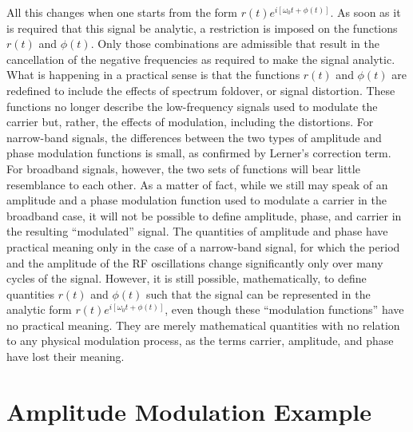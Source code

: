 \documentclass[11pt]{article}
\begin{document}
All this changes when one starts from the form $r(t)e^{i[\omega_0 t + \phi(t)]}$. As soon as it is required that this signal be analytic, a restriction is imposed on the functions $r(t)$ and $\phi(t)$. Only those combinations are admissible that result in the cancellation of the negative frequencies as required to make the signal analytic. What is happening in a practical sense is that the functions $r(t)$ and $\phi(t)$ are redefined to include the effects of spectrum foldover, or signal distortion. These functions no longer describe the low-frequency signals used to modulate the carrier but, rather, the effects of modulation, including the distortions. For narrow-band signals, the differences between the two types of amplitude and phase modulation functions is small, as confirmed by Lerner's correction term. For broadband signals, however, the two sets of functions will bear little resemblance to each other. As a matter of fact, while we still may speak of an amplitude and a phase modulation function used to modulate a carrier in the broadband case, it will not be possible to define amplitude, phase, and carrier in the resulting ``modulated'' signal. The quantities of amplitude and phase have practical meaning only in the case of a narrow-band signal, for which the period and the amplitude of the RF oscillations change significantly only over many cycles of the signal. However, it is still possible, mathematically, to define quantities $r(t)$ and $\phi(t)$ such that the signal can be represented in the analytic form $r(t)e^{i[\omega_0 t + \phi(t)]}$, even though these ``modulation functions'' have no practical meaning. They are merely mathematical quantities with no relation to any physical modulation process, as the terms carrier, amplitude, and phase have lost their meaning.

\section{Amplitude Modulation Example}
\label{sec:amplitude_modulation}
\end{document}
